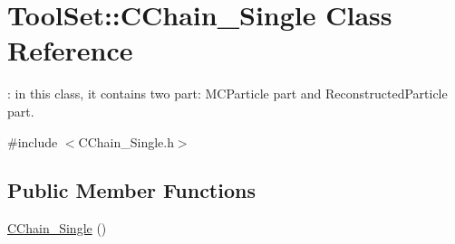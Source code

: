\hypertarget{classToolSet_1_1CChain__Single}{
\section{ToolSet::CChain\_\-Single Class Reference}
\label{classToolSet_1_1CChain__Single}
}


: in this class, it contains two part: MCParticle part and ReconstructedParticle part.  


{\ttfamily \#include $<$CChain\_\-Single.h$>$}\subsection*{Public Member Functions}
\begin{DoxyCompactItemize}
\item 
\hypertarget{classToolSet_1_1CChain__Single_acfe5a82da8d9f4e0d5339b19b0aaca55}{
\hyperlink{classToolSet_1_1CChain__Single_acfe5a82da8d9f4e0d5339b19b0aaca55}{CChain\_\-Single} ()}
\label{classToolSet_1_1CChain__Single_acfe5a82da8d9f4e0d5339b19b0aaca55}


\end{DoxyCompactItemize}
